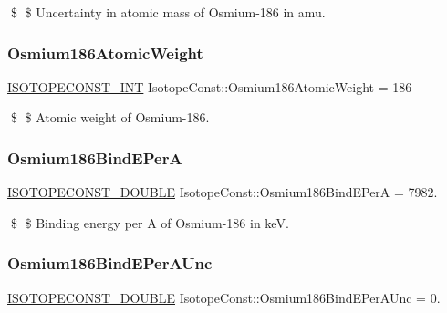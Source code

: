 \$ \$ Uncertainty in atomic mass of Osmium-\/186 in amu. \mbox{\label{group___isotope_const-_osmium-_os186_ga42d05db360fbb9c012de5cfe7700669f}} 
\subsubsection{\texorpdfstring{Osmium186\+Atomic\+Weight}{Osmium186AtomicWeight}}
{\footnotesize\ttfamily \mbox{\hyperlink{group___isotope_const-_macros_ga5f18360b3e99483a35c32d789e62621c}{I\+S\+O\+T\+O\+P\+E\+C\+O\+N\+S\+T\+\_\+\+I\+NT}} Isotope\+Const\+::\+Osmium186\+Atomic\+Weight = 186}

\$ \$ Atomic weight of Osmium-\/186. \mbox{\label{group___isotope_const-_osmium-_os186_gaf0e933a427daaf9c815e012d4a9c7ee0}} 
\subsubsection{\texorpdfstring{Osmium186\+Bind\+E\+PerA}{Osmium186BindEPerA}}
{\footnotesize\ttfamily \mbox{\hyperlink{group___isotope_const-_macros_ga8f45a7272ce02c0b4c65c44636ed719a}{I\+S\+O\+T\+O\+P\+E\+C\+O\+N\+S\+T\+\_\+\+D\+O\+U\+B\+LE}} Isotope\+Const\+::\+Osmium186\+Bind\+E\+PerA = 7982.}

\$ \$ Binding energy per A of Osmium-\/186 in keV. \mbox{\label{group___isotope_const-_osmium-_os186_gab9fd685488556df653162f7eac247f19}} 
\subsubsection{\texorpdfstring{Osmium186\+Bind\+E\+Per\+A\+Unc}{Osmium186BindEPerAUnc}}
{\footnotesize\ttfamily \mbox{\hyperlink{group___isotope_const-_macros_ga8f45a7272ce02c0b4c65c44636ed719a}{I\+S\+O\+T\+O\+P\+E\+C\+O\+N\+S\+T\+\_\+\+D\+O\+U\+B\+LE}} Isotope\+Const\+::\+Osmium186\+Bind\+E\+Per\+A\+Unc = 0.}

